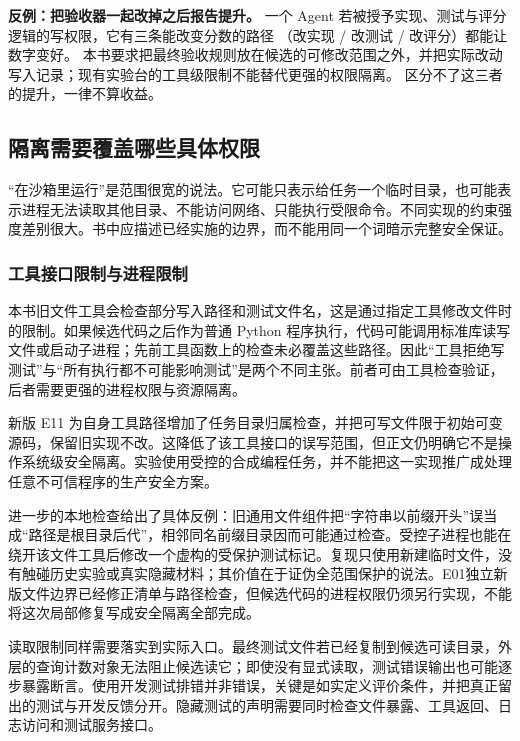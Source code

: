 \begin{pitfallbox}
\textbf{反例：把验收器一起改掉之后报告提升。}
一个 Agent 若被授予实现、测试与评分逻辑的写权限，它有三条能改变分数的路径
（改实现 / 改测试 / 改评分）都能让数字变好。
本书要求把最终验收规则放在候选的可修改范围之外，并把实际改动写入记录；现有实验台的工具级限制不能替代更强的权限隔离。
区分不了这三者的提升，一律不算收益。
\end{pitfallbox}

\subsection{隔离需要覆盖哪些具体权限}
\label{sec:ch14-permission-boundary}

“在沙箱里运行”是范围很宽的说法。它可能只表示给任务一个临时目录，也可能表示进程无法读取其他目录、不能访问网络、只能执行受限命令。不同实现的约束强度差别很大。书中应描述已经实施的边界，而不能用同一个词暗示完整安全保证。

\subsubsection{工具接口限制与进程限制}

本书旧文件工具会检查部分写入路径和测试文件名，这是通过指定工具修改文件时的限制。如果候选代码之后作为普通 Python 程序执行，代码可能调用标准库读写文件或启动子进程；先前工具函数上的检查未必覆盖这些路径。因此“工具拒绝写测试”与“所有执行都不可能影响测试”是两个不同主张。前者可由工具检查验证，后者需要更强的进程权限与资源隔离。

新版 E11 为自身工具路径增加了任务目录归属检查，并把可写文件限于初始可变源码，保留旧实现不改。这降低了该工具接口的误写范围，但正文仍明确它不是操作系统级安全隔离。实验使用受控的合成编程任务，并不能把这一实现推广成处理任意不可信程序的生产安全方案。

进一步的本地检查给出了具体反例：旧通用文件组件把“字符串以前缀开头”误当成“路径是根目录后代”，相邻同名前缀目录因而可能通过检查。受控子进程也能在绕开该文件工具后修改一个虚构的受保护测试标记。复现只使用新建临时文件，没有触碰历史实验或真实隐藏材料；其价值在于证伪全范围保护的说法。E01独立新版文件边界已经修正清单与路径检查，但候选代码的进程权限仍须另行实现，不能将这次局部修复写成安全隔离全部完成。

读取限制同样需要落实到实际入口。最终测试文件若已经复制到候选可读目录，外层的查询计数对象无法阻止候选读它；即使没有显式读取，测试错误输出也可能逐步暴露断言。使用开发测试排错并非错误，关键是如实定义评价条件，并把真正留出的测试与开发反馈分开。隐藏测试的声明需要同时检查文件暴露、工具返回、日志访问和测试服务接口。

